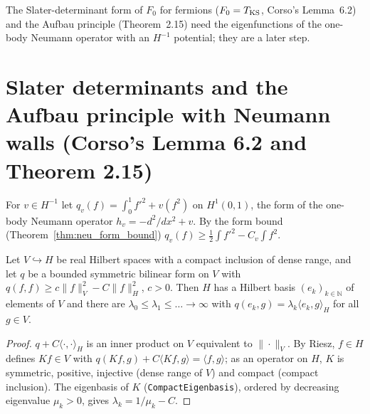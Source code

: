 The Slater-determinant form of $F_0$ for fermions ($F_0=T_{\rm KS}$, Corso's Lemma~6.2) and the Aufbau principle
(Theorem~2.15) need the eigenfunctions of the one-body Neumann operator with an $H^{-1}$ potential; they are a later step.

\section{Slater determinants and the Aufbau principle with Neumann walls (Corso's Lemma 6.2 and Theorem 2.15)}


For $v\in H^{-1}$ let $q_v(f)=\int_0^1f'^2+v(f^2)$ on $H^1(0,1)$, the form of the one-body Neumann operator $h_v=-d^2/dx^2+v$.
By the form bound (Theorem~\ref{thm:neu_form_bound}) $q_v(f)\ge\frac12\int f'^2-C_v\int f^2$.

\begin{theorem}
  \label{thm:form_eigenbasis}
  \leanok
  Let $V\hookrightarrow H$ be real Hilbert spaces with a compact inclusion of dense range, and let $q$ be a bounded symmetric
  bilinear form on $V$ with $q(f,f)\ge c\|f\|_V^2-C\|f\|_H^2$, $c>0$. Then $H$ has a Hilbert basis $(e_k)_{k\in\mathbb N}$ of
  elements of $V$ and there are $\lambda_0\le\lambda_1\le\dots\to\infty$ with $q(e_k,g)=\lambda_k\langle e_k,g\rangle_H$ for all
  $g\in V$.
\end{theorem}
\begin{proof}
  \leanok
  $q+C\langle\cdot,\cdot\rangle_H$ is an inner product on $V$ equivalent to $\|\cdot\|_V$. By Riesz, $f\in H$ defines
  $Kf\in V$ with $q(Kf,g)+C\langle Kf,g\rangle=\langle f,g\rangle$; as an operator on $H$, $K$ is symmetric, positive, injective
  (dense range of $V$) and compact (compact inclusion). The eigenbasis of $K$ (\texttt{CompactEigenbasis}), ordered by
  decreasing eigenvalue $\mu_k>0$, gives $\lambda_k=1/\mu_k-C$.
\end{proof}

